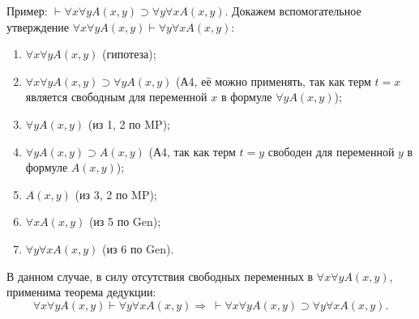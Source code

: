 Пример: $\vdash \forall x\forall yA(x, y) \supset \forall y\forall xA(x, y)$. Докажем вспомогательное утверждение $\forall x\forall yA(x, y) \vdash \forall y\forall xA(x, y)$:
\begin{enumerate}
    \item $\forall x\forall yA(x, y)$ (гипотеза);
    \item $\forall x\forall yA(x, y) \supset \forall yA(x, y)$ (А4, её можно применять, так как терм $t = x$ является свободным для переменной $x$ в формуле $\forall yA(x, y)$);
    \item $\forall yA(x, y)$ (из 1, 2 по MP);
    \item $\forall yA(x, y) \supset A(x, y)$ (А4, так как терм $t = y$ свободен для переменной $y$ в формуле $A(x, y)$);
    \item $A(x, y)$ (из 3, 2 по MP);
    \item $\forall xA(x, y)$ (из 5 по Gen);
    \item $\forall y\forall xA(x, y)$ (из 6 по Gen).
\end{enumerate}
В данном случае, в силу отсутствия свободных переменных в $\forall x\forall yA(x, y)$, применима теорема дедукции: 
\[
    \forall x\forall yA(x, y) \vdash \forall y\forall xA(x, y) \Longrightarrow\ \vdash \forall x\forall yA(x, y) \supset \forall y\forall xA(x, y).
\]